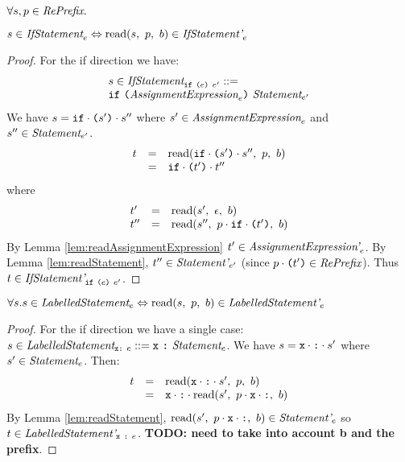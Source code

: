 \documentclass[preprint,10pt]{sigplanconf}
\begin{document}
\begin{lemma}\mbox{}
  
  \( \forall s, p \in \textit{RePrefix}. \)

  \( s \in \textit{IfStatement}_{e} \Leftrightarrow 
  \textrm{read}(s,~p,~b) \in \textit{IfStatement'}_{e} \)
\end{lemma}
\begin{proof}
  For the if direction we have:
  \[
  \begin{array}{lcl}
    s \in
    \textit{IfStatement}_{\texttt{if}~\texttt{(}e\texttt{)}~e'} 
    ::= 
    \\
    \texttt{if}~ \texttt{(}\textit{AssignmentExpression}_{e}\texttt{)}~
    \textit{Statement}_{e'}
  \end{array}
  \]
  We have \( s = \texttt{if}\cdot \texttt{(}s'\texttt{)}\cdot s'' \) where \( s' \in
  \textit{AssignmentExpression}_{e} \) and \( s'' \in \textit{Statement}_{e'} \).
  \[
  \begin{array}{rcl}
    t &=& \textrm{read}(
      \texttt{if}\cdot \texttt{(}s'\texttt{)}\cdot s'' 
    ,~p,~b)
    \\
    &=& \texttt{if} \cdot \texttt{(}t'\texttt{)} \cdot t'' 
  \end{array}
  \]
  where 
  \[ 
  \begin{array}{lcl}
    t' &=& \textrm{read}(s',~\epsilon,~b)
    \\
    t'' &=& \textrm{read}(s'',~
      p \cdot \texttt{if} \cdot \texttt{(}t'\texttt{)}
    ,~b)
  \end{array}
  \]
  By Lemma \ref{lem:readAssignmentExpression} \( t' \in
  \textit{AssignmentExpression'}_{e} \). By Lemma
  \ref{lem:readStatement}, \( t'' \in \textit{Statement'}_{e'} \) (since
  \( p \cdot \texttt{(}t'\texttt{)} \in \textit{RePrefix} \)). Thus \( t \in
  \textit{IfStatement'}_{\texttt{if}~\texttt{(}e\texttt{)}~e'} \).
\end{proof}

\begin{lemma}\mbox{}
  
  \( \forall s. s \in \textit{LabelledStatement}_{e} \Leftrightarrow 
  \textrm{read}(s,~p,~b) \in \textit{LabelledStatement'}_{e} \)
\end{lemma}
\begin{proof}
  For the if direction we have a single case: \( s \in
  \textit{LabelledStatement}_{\texttt{x} \texttt{:}~e} ::=
  \texttt{x}~\texttt{:}~\textit{Statement}_{e} \). We have \( s = \texttt{x} \cdot
  \texttt{:} \cdot s' \) where \( s' \in \textit{Statement}_{e} \).
  Then:
  \[
  \begin{array}{rcl}
    t &=& \textrm{read}(\texttt{x} \cdot \texttt{:} \cdot s',~p,~b)
    \\
    &=& \texttt{x} \cdot \texttt{:} \cdot 
    \textrm{read}(s',~
      p \cdot \texttt{x} \cdot \texttt{:}
    ,~b)
  \end{array}
  \]
  By Lemma \ref{lem:readStatement}, \( \textrm{read}(s',~p \cdot \texttt{x} \cdot
    \texttt{:},~b) \in \textit{Statement'}_{e} \) so \( t \in
  \textit{LabelledStatement'}_{\texttt{x}~\texttt{:}~e} \).
  \textbf{TODO: need to take into account b and the prefix}.
\end{proof}
\end{document}
